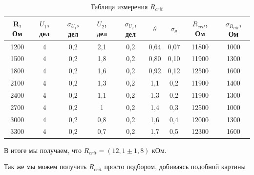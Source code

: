 \documentclass[a4paper, 12pt]{article}%
\begin{document}
\begin{table}[h!]
\begin{center}
\begin{tabular}{|c|c|c|c|c|c|c|c|c|}
\hline
R, Ом & $U_1$, дел & $\sigma_{U_1}$, дел & $U_2$, дел & $\sigma_{U_2}$, дел & $\theta$ & $\sigma_{\theta}$ & $R_{crit}$, Ом & $\sigma_{R_{crit}}$, Ом \\ \hline
1200  & 4          & 0,2                 & 2,1        & 0,2                 & 0,64     & 0,07              & 11800          & 1000                    \\ \hline
1500  & 4          & 0,2                 & 1,8        & 0,2                 & 0,80     & 0,10              & 11900          & 1300                    \\ \hline
1800  & 4          & 0,2                 & 1,6        & 0,2                 & 0,92     & 0,12              & 12500          & 1600                    \\ \hline
2100  & 4          & 0,2                 & 1,3        & 0,2                 & 1,1      & 0,2               & 11900          & 1400                    \\ \hline
2400  & 4          & 0,2                 & 1,1        & 0,2                 & 1,3      & 0,2               & 11900          & 1300                    \\ \hline
2700  & 4          & 0,2                 & 1          & 0,2                 & 1,4      & 0,3               & 12500          & 1000                    \\ \hline
3000  & 4          & 0,2                 & 0,8        & 0,2                 & 1,6      & 0,4               & 12000          & 1300                    \\ \hline
3300  & 4          & 0,2                 & 0,7        & 0,2                 & 1,7      & 0,5               & 12300          & 1600                    \\ \hline
\end{tabular}
\caption{Таблица измерения $R_{crit}$}
\end{center}
\end{table}

В итоге мы получаем, что $R_{crit} = (12,1 \pm 1,8)$ кОм.

Так же мы можем получить $R_{crit}$ просто подбором, добиваясь подобной картины
\end{document}
